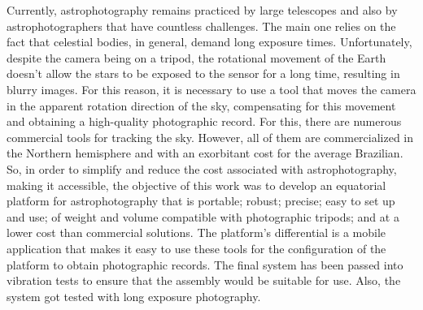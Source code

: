 Currently, astrophotography remains practiced by large telescopes and also by astrophotographers that have countless challenges. The main one relies on the fact that celestial bodies, in general, demand long exposure times. Unfortunately, despite the camera being on a tripod, the rotational movement of the Earth doesn't allow the stars to be exposed to the sensor for a long time, resulting in blurry images. For this reason, it is necessary to use a tool that moves the camera in the apparent rotation direction of the sky, compensating for this movement and obtaining a high-quality photographic record. For this, there are numerous commercial tools for tracking the sky. However, all of them are commercialized in the Northern hemisphere and with an exorbitant cost for the average Brazilian. So, in order to simplify and reduce the cost associated with astrophotography, making it accessible, the objective of this work was to develop an equatorial platform for astrophotography that is portable; robust; precise; easy to set up and use; of weight and volume compatible with photographic tripods; and at a lower cost than commercial solutions. The platform's differential is a mobile application that makes it easy to use these tools for the configuration of the platform to obtain photographic records. The final system has been passed into vibration tests to ensure that the assembly would be suitable for use.  Also, the system got tested with long exposure photography.